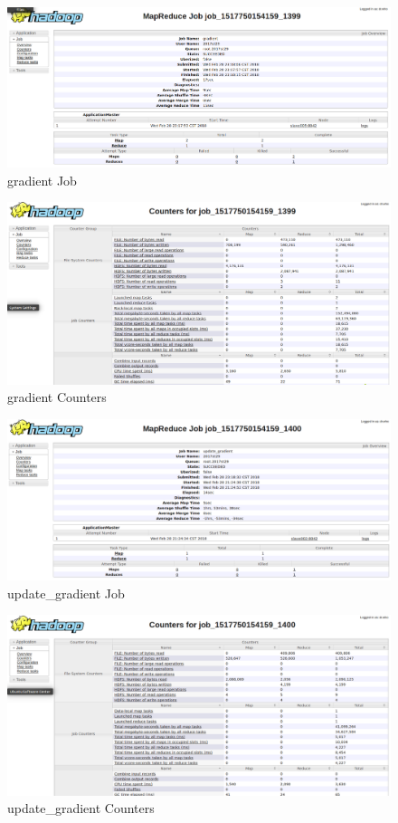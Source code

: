 \documentclass[a4paper,UTF8]{article}
\theoremstyle{definition}
\begin{document}
\begin{figure}[H]
	\centering
	\includegraphics[width=\textwidth]{pic/399_gradient_job.png}
	\caption{gradient Job}
\end{figure}
\begin{figure}[H]
	\centering
	\includegraphics[width=\textwidth]{pic/399_gradient_counters.png}
	\caption{gradient Counters}
\end{figure}

\begin{figure}[H]
	\centering
	\includegraphics[width=\textwidth]{pic/400_update_gradient_job.png}
	\caption{update\_gradient Job}
\end{figure}
\begin{figure}[H]
	\centering
	\includegraphics[width=\textwidth]{pic/400_update_gradient_counters.png}
	\caption{update\_gradient Counters}
\end{figure}
\end{document}
